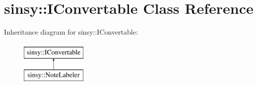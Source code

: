 \hypertarget{classsinsy_1_1IConvertable}{\section{sinsy\-:\-:\-I\-Convertable \-Class \-Reference}
\label{classsinsy_1_1IConvertable}
}
\-Inheritance diagram for sinsy\-:\-:\-I\-Convertable\-:\begin{figure}[H]
\begin{center}
\leavevmode
\includegraphics[height=2.000000cm]{classsinsy_1_1IConvertable}
\end{center}
\end{figure}
